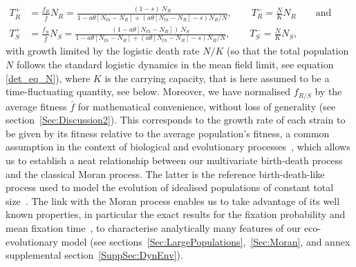 \documentclass{article}
\begin{document}
\begin{align}
 T^+_{R}&=\frac{f_{R}}{\bar{f}}N_{R}=\frac{(1-s)~N_R}{1-a\theta\left[N_{th}-N_R\right]+(a\theta\left[N_{th}-N_R\right]-s)N_R/N}, \qquad  
T^-_{R}=\frac{N}{K}N_{R} \qquad \text{and}\qquad \nonumber\\
 T^+_{S}&=\frac{f_{S}}{\bar{f}}N_{S}=\frac{(1-a\theta\left[N_{th}-N_R\right])~N_S}{1-a\theta\left[N_{th}-N_R\right]+(a\theta\left[N_{th}-N_R\right]-s)N_R/N}, \qquad
T^-_{S}=\frac{N}{K}N_{S},
\label{eq:transrates}
\end{align}
with growth limited by the logistic death rate $N/K$ (so that the total population \(N\) follows the standard logistic dynamics in the mean field limit, see equation \eqref{det_eq_N}), where $K$ is the carrying capacity, that is here assumed to be a time-fluctuating quantity, see below. Moreover, we have normalised $f_{R/S}$ by the average fitness \(\bar{f}\) for mathematical convenience,  without loss of generality (see section~\ref{Sec:Discussion2}). This corresponds to the growth rate of each strain to be given by its fitness relative to the average population's fitness, a common assumption in the context of  biological and evolutionary processes~\cite{Ewens,Chesson81,traulsen2009stochastic}, which allows us to establish a neat relationship between our multivariate birth-death process and the classical Moran process. The latter is the reference birth-death-like process used to model the evolution of idealised populations of constant total size~\cite{Moran, Ewens, antal2006fixation, Blythe07, Cremer11}. The link with the Moran process enables us to take advantage of its well known properties, in particular the exact results for the  fixation probability and mean fixation time~\cite{Moran, Ewens, antal2006fixation, Blythe07}, to characterise analytically many features of our eco-evolutionary model (see sections~\ref{Sec:LargePopulations},~\ref{Sec:Moran}, and annex supplemental section~\ref{SuppSec:DynEnv}).
\end{document}
